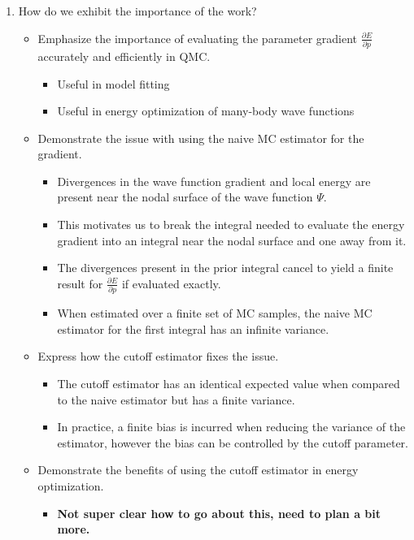 \documentclass{article}
\begin{document}
\begin{enumerate}
\item How do we exhibit the importance of the work? 
\begin{itemize}
\item Emphasize the importance of evaluating the parameter gradient $\frac{\partial E}{\partial p}$ accurately and efficiently in QMC.
\begin{itemize}
\item Useful in model fitting 
\item Useful in energy optimization of many-body wave functions
\end{itemize}
\item Demonstrate the issue with using the naive MC estimator for the gradient.
\begin{itemize}
\item Divergences in the wave function gradient and local energy are present near the nodal surface of the wave function $\Psi$.
\item This motivates us to break the integral needed to evaluate the energy gradient into an integral near the nodal surface and one away from it.
\item The divergences present in the prior integral cancel to yield a finite result for  $\frac{\partial E}{\partial p}$ if evaluated exactly.
\item When estimated over a finite set of MC samples, the naive MC estimator for the first integral has an infinite variance.
\end{itemize}
\item Express how the cutoff estimator fixes the issue.
\begin{itemize}
\item The cutoff estimator has an identical expected value when compared to the naive estimator but has a finite variance.
\item In practice, a finite bias is incurred when reducing the variance of the estimator, however the bias can be controlled by the cutoff parameter.
\end{itemize}
\item Demonstrate the benefits of using the cutoff estimator in energy optimization.
\begin{itemize}
\item \textbf{Not super clear how to go about this, need to plan a bit more.}
\end{itemize}
\end{itemize} 
\end{enumerate}
\end{document}
